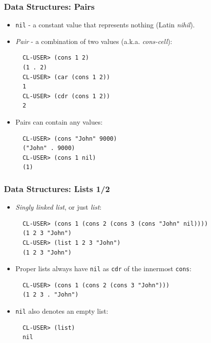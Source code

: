 \documentclass{beamer}
\begin{document}
\begin{frame}[fragile]
  \frametitle{Data Structures: Pairs}
  \begin{itemize}
  \item \texttt{nil} - a constant value that represents nothing (Latin \textit{nihil}).
  \item \textit{Pair} - a combination of two values (a.k.a. \textit{cons-cell}):
\begin{verbatim}
  CL-USER> (cons 1 2)
  (1 . 2)
  CL-USER> (car (cons 1 2))
  1
  CL-USER> (cdr (cons 1 2))
  2
\end{verbatim}
  \item Pairs can contain any values:
\begin{verbatim}
  CL-USER> (cons "John" 9000)
  ("John" . 9000)
  CL-USER> (cons 1 nil)
  (1)
\end{verbatim}
  \end{itemize}
\end{frame}

\begin{frame}[fragile]
  \frametitle{Data Structures: Lists 1/2}
  \begin{itemize}
  \item \textit{Singly linked list}, or just \textit{list}:
\begin{verbatim}
  CL-USER> (cons 1 (cons 2 (cons 3 (cons "John" nil))))
  (1 2 3 "John")
  CL-USER> (list 1 2 3 "John")
  (1 2 3 "John")
\end{verbatim}
  \item Proper lists always have \texttt{nil} as
    \texttt{cdr} of the innermost \texttt{cons}:
\begin{verbatim}
  CL-USER> (cons 1 (cons 2 (cons 3 "John")))
  (1 2 3 . "John")
\end{verbatim}
  \item \texttt{nil} also denotes an empty list:
\begin{verbatim}
  CL-USER> (list)
  nil
\end{verbatim}
  \end{itemize}
\end{frame}
\end{document}
